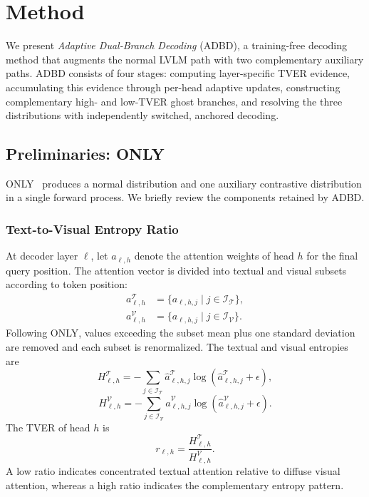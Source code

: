 \section{Method}
\label{sec:method}

We present \emph{Adaptive Dual-Branch Decoding} (ADBD), a training-free decoding method that augments the normal LVLM path with two complementary auxiliary paths. ADBD consists of four stages: computing layer-specific TVER evidence, accumulating this evidence through per-head adaptive updates, constructing complementary high- and low-TVER ghost branches, and resolving the three distributions with independently switched, anchored decoding.

\subsection{Preliminaries: ONLY}

ONLY~\cite{wan2025only} produces a normal distribution and one auxiliary contrastive distribution in a single forward process. We briefly review the components retained by ADBD.

\subsubsection{Text-to-Visual Entropy Ratio}

At decoder layer $\ell$, let $a_{\ell,h}$ denote the attention weights of head $h$ for the final query position. The attention vector is divided into textual and visual subsets according to token position:
\begin{equation}
\begin{aligned}
a_{\ell,h}^{\mathcal{T}} &=
 \{a_{\ell,h,j}\mid j\in\mathcal{I}_{\mathcal{T}}\},\\
a_{\ell,h}^{\mathcal{V}} &=
 \{a_{\ell,h,j}\mid j\in\mathcal{I}_{\mathcal{V}}\}.
\end{aligned}
\end{equation}
Following ONLY, values exceeding the subset mean plus one standard deviation are removed and each subset is renormalized. The textual and visual entropies are
\begin{equation}
H_{\ell,h}^{\mathcal{T}}
=-\sum_{j\in\mathcal{I}_{\mathcal{T}}}
\hat a_{\ell,h,j}^{\mathcal{T}}
\log\!\left(\hat a_{\ell,h,j}^{\mathcal{T}}+\epsilon\right),
\end{equation}
\begin{equation}
H_{\ell,h}^{\mathcal{V}}
=-\sum_{j\in\mathcal{I}_{\mathcal{V}}}
\hat a_{\ell,h,j}^{\mathcal{V}}
\log\!\left(\hat a_{\ell,h,j}^{\mathcal{V}}+\epsilon\right).
\end{equation}
The TVER of head $h$ is
\begin{equation}
r_{\ell,h}
=
\frac{H_{\ell,h}^{\mathcal{T}}}
     {H_{\ell,h}^{\mathcal{V}}}.
\end{equation}
A low ratio indicates concentrated textual attention relative to diffuse visual attention, whereas a high ratio indicates the complementary entropy pattern.

